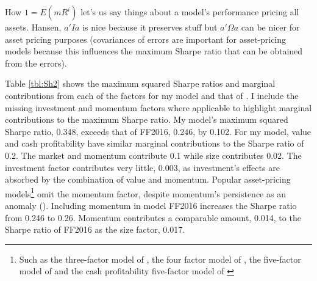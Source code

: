 How $1=E(mR^i)$ let's us say things about a model's performance pricing all 
assets.
Hansen, $a'Ia$ is nice because it preserves stuff but
$a'\Omega a$ can be nicer for asset pricing purposes (covariances of errors 
are important for asset-pricing models because this influences the maximum 
Sharpe ratio that can be obtained from the errors).

Table \ref{tbl:Sh2} shows the maximum squared Sharpe ratios and marginal 
contributions from each of the factors for my model and that of 
\textcite{fama2016choosing}.
I include the missing investment and momentum factors where applicable to 
highlight marginal contributions to the maximum Sharpe ratio.
My model's maximum squared Sharpe ratio, 0.348, exceeds that of FF2016, 0.246, 
by 0.102.
For my model, value and cash profitability have similar marginal 
contributions to the Sharpe ratio of 0.2.
The market and momentum contribute 0.1 while size contributes 0.02.
The investment factor contributes very little, 0.003, as investment's effects 
are absorbed by the combination of value and momentum.
Popular asset-pricing models\footnote{Such as the three-factor model of 
  \textcite{fama1993common}, the four factor model of 
  \textcite{hou2015digesting}, the 
  five-factor model of \textcite{fama2015five} and the cash profitability 
  five-factor model of \textcite{fama2016choosing}} omit the momentum factor, 
despite 
momentum's persistence as an anomaly (\parencite{fama2016dissecting, 
  fama2017international}).
Including momentum in model FF2016 increases the Sharpe ratio from 0.246 
to 0.26.
Momentum contributes a comparable amount, 0.014, to the Sharpe ratio 
of FF2016 as the size factor, 0.017.
